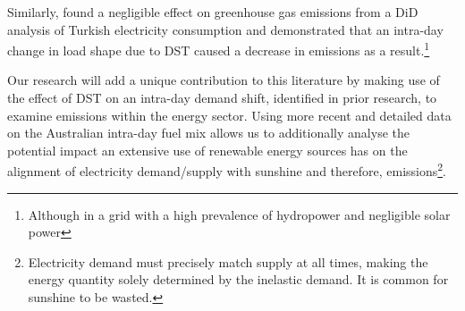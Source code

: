 Similarly, \textcite{turkey} found a negligible effect on greenhouse gas emissions from a \ac{DiD} analysis of Turkish electricity consumption and demonstrated that an intra-day change in load shape due to \ac{DST} caused a decrease in emissions as a result.\footnote{Although in a grid with a high prevalence of hydropower and negligible solar power}

Our research will add a unique contribution to this literature by making use of the effect of \ac{DST} on an intra-day demand shift, identified in prior research, to examine emissions within the energy sector. Using more recent and detailed data on the Australian intra-day fuel mix allows us to additionally analyse the potential impact an extensive use of renewable energy sources has on the alignment of electricity demand/supply with sunshine and therefore, emissions\footnote{Electricity demand must precisely match supply at all times, making the energy quantity solely determined by the inelastic demand. It is common for sunshine to be wasted.}.

